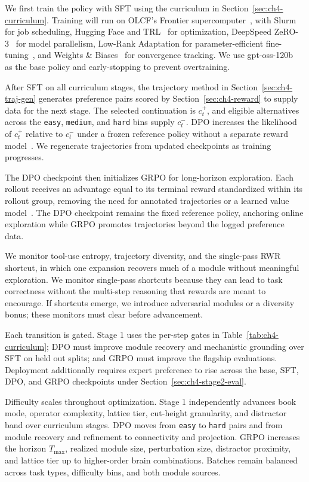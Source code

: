 We first train the policy with SFT using the curriculum in Section~\ref{sec:ch4-curriculum}. Training will run on OLCF's Frontier supercomputer~\cite{frontier}, with Slurm~\cite{slurm} for job scheduling, Hugging Face and TRL~\cite{trl} for optimization, DeepSpeed ZeRO-3~\cite{deepspeed} for model parallelism, Low-Rank Adaptation for parameter-efficient fine-tuning~\cite{hu2022lora}, and Weights \& Biases~\cite{wandb} for convergence tracking. We use gpt-oss-120b~\cite{gpt-oss} as the base policy and early-stopping to prevent overtraining.

After SFT on all curriculum stages, the trajectory method in Section~\ref{sec:ch4-traj-gen} generates preference pairs scored by Section~\ref{sec:ch4-reward} to supply data for the next stage. The selected continuation is $c_t^+$, and eligible alternatives across the \texttt{easy}, \texttt{medium}, and \texttt{hard} bins supply $c_t^-$. DPO increases the likelihood of $c_t^+$ relative to $c_t^-$ under a frozen reference policy without a separate reward model~\cite{dpo}. We regenerate trajectories from updated checkpoints as training progresses.

The DPO checkpoint then initializes GRPO for long-horizon exploration. Each rollout receives an advantage equal to its terminal reward standardized within its rollout group, removing the need for annotated trajectories or a learned value model~\cite{shao2024deepseekmath}. The DPO checkpoint remains the fixed reference policy, anchoring online exploration while GRPO promotes trajectories beyond the logged preference data.

We monitor tool-use entropy, trajectory diversity, and the single-pass RWR shortcut, in which one expansion recovers much of a module without meaningful exploration. We monitor single-pass shortcuts because they can lead to task correctness without the multi-step reasoning that rewards are meant to encourage. If shortcuts emerge, we introduce adversarial modules or a diversity bonus; these monitors must clear before advancement.

Each transition is gated. Stage 1 uses the per-step gates in Table~\ref{tab:ch4-curriculum}; DPO must improve module recovery and mechanistic grounding over SFT on held out splits; and GRPO must improve the flagship evaluations. Deployment additionally requires expert preference to rise across the base, SFT, DPO, and GRPO checkpoints under Section~\ref{sec:ch4-stage2-eval}.

Difficulty scales throughout optimization. Stage 1 independently advances book mode, operator complexity, lattice tier, cut-height granularity, and distractor band over curriculum stages. DPO moves from \texttt{easy} to \texttt{hard} pairs and from module recovery and refinement to connectivity and projection. GRPO increases the horizon $T_{\max}$, realized module size, perturbation size, distractor proximity, and lattice tier up to higher-order brain combinations. Batches remain balanced across task types, difficulty bins, and both module sources.

